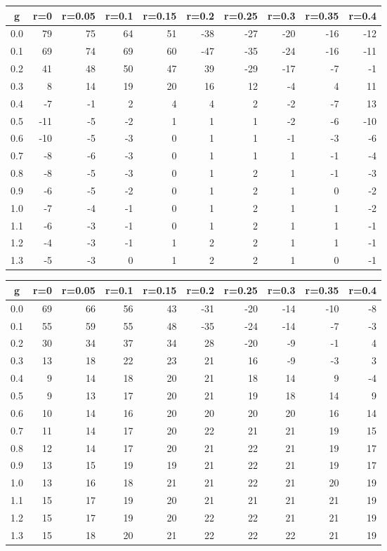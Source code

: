 %
\begin{table}[!tbp]
 \begin{center}
 \begin{tabular}{rrrrrrrrrr}\hline\hline
\multicolumn{1}{c}{g}&\multicolumn{1}{c}{r=0}&\multicolumn{1}{c}{r=0.05}&\multicolumn{1}{c}{r=0.1}&\multicolumn{1}{c}{r=0.15}&\multicolumn{1}{c}{r=0.2}&\multicolumn{1}{c}{r=0.25}&\multicolumn{1}{c}{r=0.3}&\multicolumn{1}{c}{r=0.35}&\multicolumn{1}{c}{r=0.4}\tabularnewline
\hline
0.0& 79&75&64&51&-38&-27&-20&-16&-12\tabularnewline
0.1& 69&74&69&60&-47&-35&-24&-16&-11\tabularnewline
0.2& 41&48&50&47& 39&-29&-17& -7& -1\tabularnewline
0.3&  8&14&19&20& 16& 12& -4&  4& 11\tabularnewline
0.4& -7&-1& 2& 4&  4&  2& -2& -7& 13\tabularnewline
0.5&-11&-5&-2& 1&  1&  1& -2& -6&-10\tabularnewline
0.6&-10&-5&-3& 0&  1&  1& -1& -3& -6\tabularnewline
0.7& -8&-6&-3& 0&  1&  1&  1& -1& -4\tabularnewline
0.8& -8&-5&-3& 0&  1&  2&  1& -1& -3\tabularnewline
0.9& -6&-5&-2& 0&  1&  2&  1&  0& -2\tabularnewline
1.0& -7&-4&-1& 0&  1&  2&  1&  1& -2\tabularnewline
1.1& -6&-3&-1& 0&  1&  2&  1&  1& -1\tabularnewline
1.2& -4&-3&-1& 1&  2&  2&  1&  1& -1\tabularnewline
1.3& -5&-3& 0& 1&  2&  2&  1&  0& -1\tabularnewline
\hline
\end{tabular}

\end{center}

\end{table}

%
\begin{table}[!tbp]
 \begin{center}
 \begin{tabular}{rrrrrrrrrr}\hline\hline
\multicolumn{1}{c}{g}&\multicolumn{1}{c}{r=0}&\multicolumn{1}{c}{r=0.05}&\multicolumn{1}{c}{r=0.1}&\multicolumn{1}{c}{r=0.15}&\multicolumn{1}{c}{r=0.2}&\multicolumn{1}{c}{r=0.25}&\multicolumn{1}{c}{r=0.3}&\multicolumn{1}{c}{r=0.35}&\multicolumn{1}{c}{r=0.4}\tabularnewline
\hline
0.0&69&66&56&43&-31&-20&-14&-10&-8\tabularnewline
0.1&55&59&55&48&-35&-24&-14& -7&-3\tabularnewline
0.2&30&34&37&34& 28&-20& -9& -1& 4\tabularnewline
0.3&13&18&22&23& 21& 16& -9& -3& 3\tabularnewline
0.4& 9&14&18&20& 21& 18& 14&  9&-4\tabularnewline
0.5& 9&13&17&20& 21& 19& 18& 14& 9\tabularnewline
0.6&10&14&16&20& 20& 20& 20& 16&14\tabularnewline
0.7&11&14&17&20& 22& 21& 21& 19&15\tabularnewline
0.8&12&14&17&20& 21& 22& 21& 19&17\tabularnewline
0.9&13&15&19&19& 21& 22& 21& 19&17\tabularnewline
1.0&13&16&18&21& 21& 22& 21& 20&19\tabularnewline
1.1&15&17&19&20& 21& 21& 21& 21&19\tabularnewline
1.2&15&17&19&20& 22& 22& 21& 21&19\tabularnewline
1.3&15&18&20&21& 22& 22& 22& 21&19\tabularnewline
\hline
\end{tabular}

\end{center}

\end{table}

